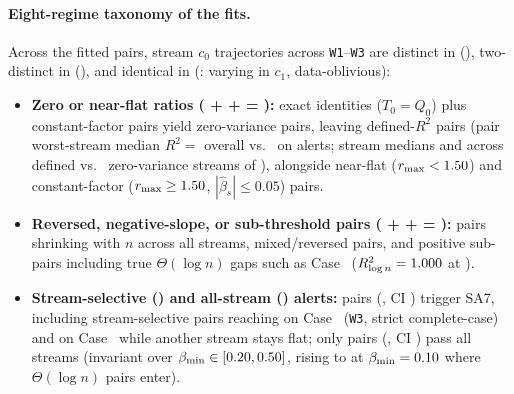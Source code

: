 \documentclass[11pt]{article}
\newcommand{\CaseRef}[1]{Case~#1}
\begin{document}
\paragraph{Eight-regime taxonomy of the \BenchFittedClusters{} fits.}
Across the \BenchFittedClusters{} fitted pairs, stream $c_0$ trajectories across \texttt{W1}--\texttt{W3} are distinct in \BenchDistinctThreeN{} (\BenchDistinctThreePct{}), two-distinct in \BenchDistinctTwoN{} (\BenchDistinctTwoPct{}), and identical in \BenchDistinctOneN{} (\BenchDistinctOnePct{}: \BenchDistinctOneCOneVarN{} varying in $c_1$, \BenchDistinctOneOblivN{} data-oblivious):
\begin{itemize}
\item \textbf{Zero or near-flat ratios (\BenchRegimeExactEqN{} + \BenchRegimeFlatLowN{} + \BenchRegimeFlatHighN{} = \BenchRegimeZeroFlatSumN{}):} \BenchRegimeExactEqN{} exact identities ($T_0 = Q_0$) plus \BenchConstZeroVarPairsN{} constant-factor pairs yield \BenchZeroVarPairsN{} zero-variance pairs, leaving \BenchDefinedRTwoPairsN{} defined-$R^2$ pairs (pair worst-stream median $R^2 =$ \BenchPairMedianRTwo{} overall vs.\ \BenchAlertPairMedianRTwo{} on alerts; stream medians \BenchAllStreamsMedianRTwo{} and \BenchAlertMedianRTwo{} across \BenchDefinedRTwoStreamsN{} defined vs.\ \BenchZeroVarStreamsN{} zero-variance streams of \BenchTotalFittedStreamsN{}), alongside \BenchRegimeFlatLowN{} near-flat ($r_{\max} < 1.50{}$) and \BenchRegimeFlatHighN{} constant-factor ($r_{\max} \ge 1.50{}$, $|\hat{\beta}_s| \le 0.05$) pairs.
\item \textbf{Reversed, negative-slope, or sub-threshold pairs (\BenchRegimeNegAllN{} + \BenchRegimeMixedN{} + \BenchRegimeSubPosN{} = \BenchRegimeRevSubSumN{}):} \BenchRegimeNegAllN{} pairs shrinking with $n$ across all streams, \BenchRegimeMixedN{} mixed/reversed pairs, and \BenchRegimeSubPosN{} positive sub-\BenchMinSlope{} pairs including true $\Theta(\log n)$ gaps such as \CaseRef{\BenchPosSevenSeven{}} ($R^2_{\log n} = 1.000{}$ at \BenchPosSevenSevenRatio{}).
\item \textbf{Stream-selective (\BenchSASevenOnlyN{}) and all-stream (\BenchPThreeCount{}) alerts:} \BenchSASevenCount{} pairs (\BenchSASevenPct{}, CI \BenchSASevenCI{}) trigger SA7, including \BenchSASevenOnlyN{} stream-selective pairs reaching \BenchPosNineZeroRatio{} on \CaseRef{\BenchPosNineZero{}} (\texttt{W3}, strict complete-case) and \BenchPosOneFourFiveRatio{} on \CaseRef{\BenchPosOneFourFive{}} while another stream stays flat; only \BenchPThreeCount{} pairs (\BenchPThreePct{}, CI \BenchPThreeCI{}) pass all streams (invariant over $\beta_{\min} \in [0.20{}, 0.50{}]$, rising to \BenchBetaGridDropAlerts{} at $\beta_{\min} = 0.10{}$ where $\Theta(\log n)$ pairs enter).
\end{itemize}
\end{document}
